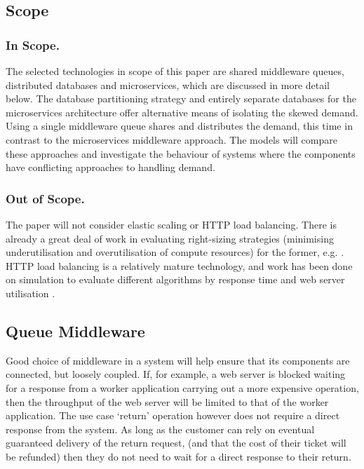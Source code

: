 \documentclass[runningheads]{llncs}
\begin{document}
%
%
\subsection{Scope}
\subsubsection{In Scope.}  The selected technologies in scope of this paper are shared middleware queues, distributed databases and microservices, which are discussed in more detail below.  The database partitioning strategy and entirely separate databases for the microservices architecture offer alternative means of isolating the skewed demand.  Using a single middleware queue shares and distributes the demand, this time in contrast to the microservices middleware approach.  The models will compare these approaches and investigate the behaviour of systems where the components have conflicting approaches to handling demand.
\subsubsection{Out of Scope.}  The paper will not consider elastic scaling or HTTP load balancing.  There is already a great deal of work in evaluating right-sizing strategies (minimising underutilisation and overutilisation of compute resources) for the former, e.g. \cite{RN49,RN62,RN48}.  HTTP load balancing is a relatively mature technology, and work has been done on simulation to evaluate different algorithms by response time and web server utilisation \cite{RN55}.

%
%

\subsection{Queue Middleware}\label{sec:middleware}

Good choice of middleware in a system will help ensure that its components are connected, but loosely coupled.  If, for example, a web server is blocked waiting for a response from a worker application carrying out a more expensive operation, then the throughput of the web server will be limited to that of the worker application.  The use case `return' operation however does not require a direct response from the system.  As long as the customer can rely on eventual guaranteed delivery of the return request, (and that the cost of their ticket will be refunded) then they do not need to wait for a direct response to their return.
\end{document}
